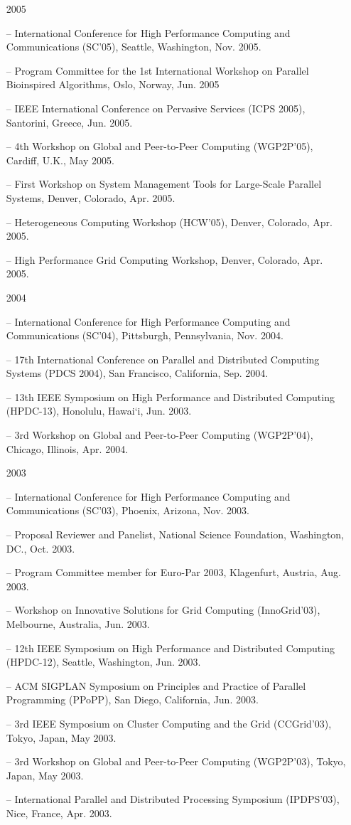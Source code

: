 \documentclass[times,11pt]{letter}
\begin{document}
\begin{itemize}
\item [2005]
\item[--]  International Conference for High Performance Computing and Communications (SC'05), Seattle, Washington, Nov. 2005.
\item[--] Program Committee for the 1st International Workshop on Parallel Bioinspired Algorithms, Oslo, Norway, Jun. 2005
\item[--]  IEEE International Conference on Pervasive Services (ICPS 2005), Santorini, Greece, Jun. 2005.
\item[--]  4th Workshop on Global and Peer-to-Peer Computing (WGP2P'05), Cardiff, U.K., May 2005. 
\item[--]  First Workshop on System Management Tools for Large-Scale Parallel Systems, Denver, Colorado, Apr. 2005.
\item[--]  Heterogeneous Computing Workshop (HCW'05), Denver, Colorado, Apr. 2005.
\item[--]  High Performance Grid Computing Workshop, Denver, Colorado, Apr. 2005.

\item [2004]
\item[--]  International Conference for High Performance Computing and Communications (SC'04), Pittsburgh, Pennsylvania, Nov. 2004.
\item[--]  17th International Conference on Parallel and Distributed Computing Systems (PDCS 2004), San Francisco, California, Sep. 2004. 
\item[--]  13th IEEE Symposium on High Performance and Distributed Computing (HPDC-13), Honolulu, Hawai`i, Jun. 2003.
\item[--]  3rd Workshop on Global and Peer-to-Peer Computing (WGP2P'04), Chicago, Illinois, Apr. 2004. 

\item [2003]
\item[--]  International Conference for High Performance Computing and Communications (SC'03), Phoenix, Arizona, Nov. 2003.
\item[--] Proposal Reviewer and Panelist, National Science Foundation, Washington, DC., Oct. 2003.
\item[--] Program Committee member for Euro-Par 2003, Klagenfurt, Austria, Aug. 2003.
\item[--]  Workshop on Innovative Solutions for Grid Computing (InnoGrid'03), Melbourne, Australia, Jun. 2003. 
\item[--]  12th IEEE Symposium on High Performance and Distributed Computing (HPDC-12), Seattle, Washington, Jun. 2003.
\item[--]  ACM SIGPLAN Symposium on Principles and Practice of Parallel Programming (PPoPP), San Diego, California, Jun. 2003.
\item[--]  3rd IEEE Symposium on Cluster Computing and the Grid (CCGrid'03), Tokyo, Japan, May 2003. 
\item[--]  3rd Workshop on Global and Peer-to-Peer Computing (WGP2P'03), Tokyo, Japan, May 2003. 
\item[--]  International Parallel and Distributed Processing Symposium (IPDPS'03), Nice, France, Apr. 2003.


\end{itemize}
\end{document}
